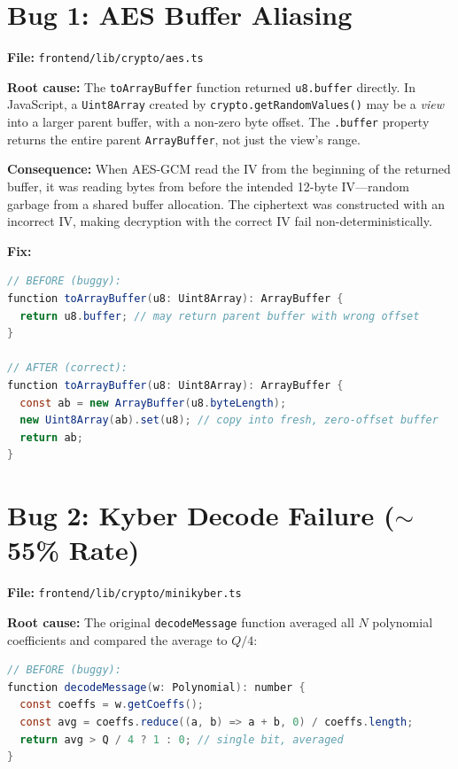 \documentclass[12pt,a4paper]{report}
\begin{document}
\section{Bug 1: AES Buffer Aliasing}

\textbf{File:} \texttt{frontend/lib/crypto/aes.ts}

\textbf{Root cause:} The \texttt{toArrayBuffer} function returned \texttt{u8.buffer}
directly. In JavaScript, a \texttt{Uint8Array} created by \texttt{crypto.getRandomValues()}
may be a \emph{view} into a larger parent buffer, with a non-zero byte offset. The
\texttt{.buffer} property returns the entire parent \texttt{ArrayBuffer}, not just
the view's range.

\textbf{Consequence:} When AES-GCM read the IV from the beginning of the returned
buffer, it was reading bytes from before the intended 12-byte IV---random garbage
from a shared buffer allocation. The ciphertext was constructed with an incorrect IV,
making decryption with the correct IV fail non-deterministically.

\textbf{Fix:}
\begin{lstlisting}[language=Java, caption={Buffer aliasing fix in aes.ts}]
// BEFORE (buggy):
function toArrayBuffer(u8: Uint8Array): ArrayBuffer {
  return u8.buffer; // may return parent buffer with wrong offset
}

// AFTER (correct):
function toArrayBuffer(u8: Uint8Array): ArrayBuffer {
  const ab = new ArrayBuffer(u8.byteLength);
  new Uint8Array(ab).set(u8); // copy into fresh, zero-offset buffer
  return ab;
}
\end{lstlisting}

\section{Bug 2: Kyber Decode Failure ($\sim$55\% Rate)}

\textbf{File:} \texttt{frontend/lib/crypto/minikyber.ts}

\textbf{Root cause:} The original \texttt{decodeMessage} function averaged all $N$
polynomial coefficients and compared the average to $Q/4$:

\begin{lstlisting}[language=Java, caption={Buggy decoder (original)}]
// BEFORE (buggy):
function decodeMessage(w: Polynomial): number {
  const coeffs = w.getCoeffs();
  const avg = coeffs.reduce((a, b) => a + b, 0) / coeffs.length;
  return avg > Q / 4 ? 1 : 0; // single bit, averaged
}
\end{lstlisting}
\end{document}
